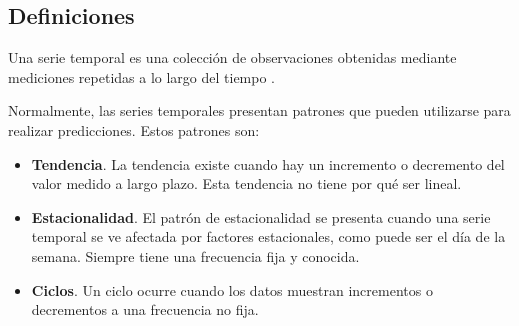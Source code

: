 \subsection{Definiciones}

Una serie temporal es una colección de observaciones obtenidas mediante mediciones repetidas a lo largo del tiempo \cite{hamilton2020time}.

Normalmente, las series temporales presentan patrones que pueden utilizarse para realizar predicciones. Estos patrones son:
\begin{itemize}
    \item \textbf{Tendencia}. La tendencia existe cuando hay un incremento o decremento del valor medido a largo plazo. Esta tendencia
        no tiene por qué ser lineal.
    \item \textbf{Estacionalidad}. El patrón de estacionalidad se presenta cuando una serie temporal se ve afectada por factores estacionales,
        como puede ser el día de la semana. Siempre tiene una frecuencia fija y conocida.
    \item \textbf{Ciclos}. Un ciclo ocurre cuando los datos muestran incrementos o decrementos a una frecuencia no fija.
\end{itemize}


